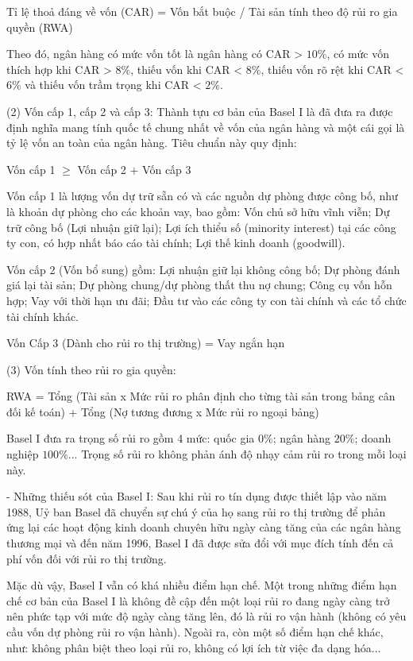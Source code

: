 Tỉ lệ thoả đáng về vốn (CAR) = Vốn bắt buộc / Tài sản tính theo độ rủi ro gia quyền (RWA)

Theo đó, ngân hàng có mức vốn tốt là ngân hàng có CAR > $10\%$, có mức vốn thích hợp khi CAR > $8\%$, thiếu vốn khi CAR < $8\%$, thiếu vốn rõ rệt khi CAR < $6\%$ và thiếu vốn trầm trọng khi CAR < $2\%$.

(2) Vốn cấp 1, cấp 2 và cấp 3: Thành tựu cơ bản của Basel I là đã đưa ra được định nghĩa mang tính quốc tế chung nhất về vốn của ngân hàng và một cái gọi là tỷ lệ vốn an toàn của ngân hàng. Tiêu chuẩn này quy định:

\begin{center}
Vốn cấp 1 $\geq$ Vốn cấp 2 $+$ Vốn cấp 3
\end{center}

Vốn cấp 1 là lượng vốn dự trữ sẵn có và các nguồn dự phòng được công bố, như là khoản dự phòng cho các khoản vay, bao gồm: Vốn chủ sở hữu vĩnh viễn; Dự trữ công bố (Lợi nhuận giữ lại); Lợi ích thiểu số (minority interest) tại các công ty con, có hợp nhất báo cáo tài chính; Lợi thế kinh doanh (goodwill).

Vốn cấp 2 (Vốn bổ sung) gồm: Lợi nhuận giữ lại không công bố; Dự phòng đánh giá lại tài sản; Dự phòng chung/dự phòng thất thu nợ chung; Công cụ vốn hỗn hợp; Vay với thời hạn ưu đãi; Đầu tư vào các công ty con tài chính và các tổ chức tài chính khác.

Vốn Cấp 3 (Dành cho rủi ro thị trường) = Vay ngắn hạn

(3) Vốn tính theo rủi ro gia quyền:

RWA = Tổng (Tài sản x Mức rủi ro phân định cho từng tài sản trong bảng cân đối kế toán) + Tổng (Nợ tương đương x Mức rủi ro ngoại bảng)

Basel I đưa ra trọng số rủi ro gồm 4 mức: quốc gia $0\%$; ngân hàng $20\%$; doanh nghiệp $100\%$... Trọng số rủi ro không phản ánh độ nhạy cảm rủi ro trong mỗi loại này.

- Những thiếu sót của Basel I: Sau khi rủi ro tín dụng được thiết lập vào năm 1988, Uỷ ban Basel đã chuyển sự chú ý của họ sang rủi ro thị trường để phản ứng lại các hoạt động kinh doanh chuyên hữu ngày càng tăng của các ngân hàng thương mại và đến năm 1996, Basel I đã được sửa đổi với mục đích tính đến cả phí vốn đối với rủi ro thị trường.

Mặc dù vậy, Basel I vẫn có khá nhiều điểm hạn chế. Một trong những điểm hạn chế cơ bản của Basel I là không đề cập đến một loại rủi ro đang ngày càng trở nên phức tạp với mức độ ngày càng tăng lên, đó là rủi ro vận hành (không có yêu cầu vốn dự phòng rủi ro vận hành). Ngoài ra, còn một số điểm hạn chế khác, như: không phân biệt theo loại rủi ro, không có lợi ích từ việc đa dạng hóa...


